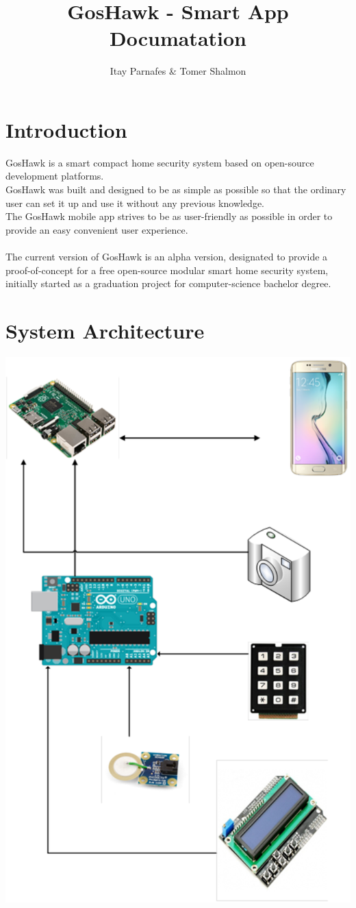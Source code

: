 \documentclass[10pt]{article}
\title{GosHawk - Smart App \\ Documatation}
\author{Itay Parnafes \& Tomer Shalmon}
\begin{document}
\maketitle
\date
\newpage
\tableofcontents
\newpage
\section{Introduction}
GosHawk is a smart compact home security system based on open-source development platforms. \\
GosHawk was built and designed to be as simple as possible so that the ordinary user can set it up and use it without any previous knowledge. \\
The GosHawk mobile app strives to be as user-friendly as possible in order to provide an easy convenient user experience. 
\\ \\
The current version of GosHawk is an alpha version, designated to provide a proof-of-concept for a free open-source modular smart home security system, initially started as a graduation project for computer-science bachelor degree.

\newpage
\section{System Architecture}
\includegraphics[scale=0.5]{arc.eps}
\end{document}
